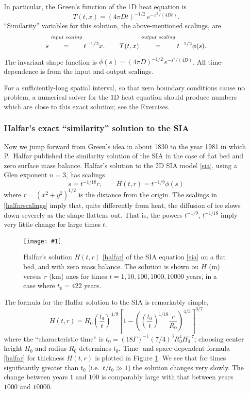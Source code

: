 \documentclass[titlepage,a4paper,final,12pt]{scrartcl}
\newcommand{\onefigsize}[3]{
\begin{figure}[ht]
\centering
\texttt{[image: \#1]}
\caption{#2}
\label{fig:#1}
\end{figure}}
\begin{document}
In particular, the Green's function of the 1D heat equation is
  $$T(t,x) = (4 \pi D t)^{-1/2}\, e^{-x^2/(4Dt)}.$$
``Similarity'' variables for this solution, the above-mentioned scalings, are
	$$s \stackrel{\text{\emph{input scaling}}}{\phantom{\Big|}=\phantom{\Big|}} t^{-1/2} x, \qquad T(t,x) \stackrel{\text{\emph{output scaling}}}{\phantom{\Big|}=\phantom{\Big|}} t^{-1/2} \phi(s).$$
The invariant shape function is $\phi(s) = (4 \pi D)^{-1/2}\, e^{-s^2/(4D)}$.  All time-dependence is from the input and output scalings.

For a sufficiently-long spatial interval, so that zero boundary conditions cause no problem, a numerical solver for the 1D heat equation should produce numbers which are close to this exact solution; see the Exercises.

\subsubsection*{Halfar's exact ``similarity'' solution to the SIA}  Now we jump forward from Green's idea in about 1830 to the year 1981 in which P.~Halfar published the similarity solution of the SIA in the case of flat bed and zero surface mass balance.  Halfar's solution to the 2D SIA model \eqref{sia}, using a Glen exponent $n=3$, has scalings
\begin{equation}
s = t^{-1/18} r, \qquad H(t,r)=t^{-1/9} \phi(s) \label{halfarscalings}
\end{equation}
where $r=(x^2+y^2)^{1/2}$ is the distance from the origin.  The scalings in \eqref{halfarscalings} imply that, quite differently from heat, the diffusion of ice slows down severely as the shape flattens out.  That is, the powers $t^{-1/9}$, $t^{-1/18}$ imply very little change for large times $t$.

\onefigsize{siascaling}{Halfar's solution $H(t,r)$ \eqref{halfar} of the SIA equation \eqref{sia} on a flat bed, and with zero mass balance.  The solution is shown on $H$ (m) versus $r$ (km) axes for times $t=1,10,100,1000,10000$ years, in a case where $t_0=422$ years.}{5.5in}

The formula for the Halfar solution to the SIA is remarkably simple,
\begin{equation}
H(t,r) = H_0 \left(\frac{t_0}{t}\right)^{1/9} \left[1 - \left(\left(\frac{t_0}{t}\right)^{1/18} \frac{r}{R_0}\right)^{4/3}\right]^{3/7} \label{halfar}
\end{equation}
where the ``characteristic time'' is $t_0 = (18 \Gamma)^{-1} (7/4)^3 R_0^4 H_0^{-7}$; choosing center height $H_0$ and radius $R_0$ determines $t_0$.  Time- and space-dependent formula \eqref{halfar} for thickness $H(t,r)$ is plotted in Figure \ref{fig:siascaling}.  We see that for times significantly greater than $t_0$ (i.e.~$t/t_0 \gg 1$) the solution changes very slowly.  The change between years $1$ and $100$ is comparably large with that between years $1000$ and $10000$.
\end{document}
